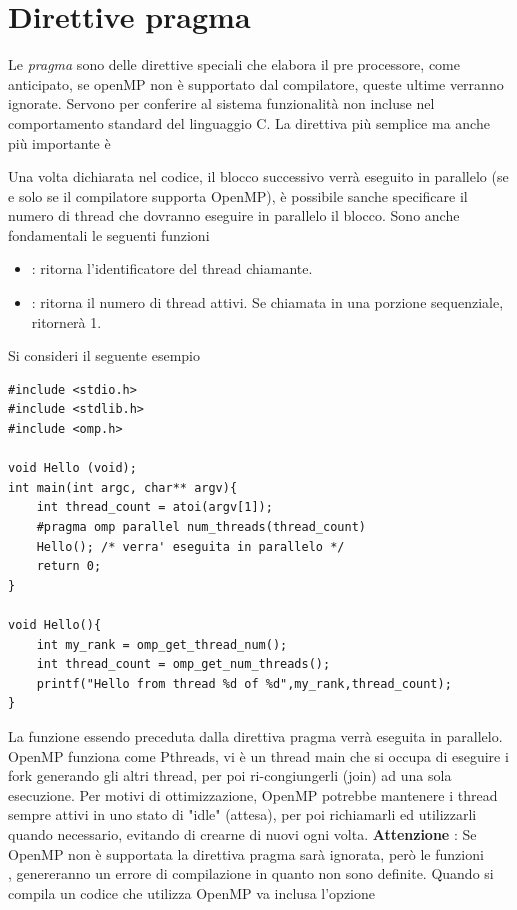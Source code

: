 \documentclass[10pt, letterpaper]{report}
\begin{document}
\section{Direttive pragma}
Le \textit{pragma} sono delle direttive speciali che elabora il pre processore, come anticipato, se openMP non è supportato dal compilatore, queste ultime verranno ignorate. Servono per conferire al sistema funzionalità non incluse nel comportamento standard del linguaggio C. \acc 
La direttiva più semplice ma anche più importante è\begin{quote}
\end{quote}
Una volta dichiarata nel codice, il blocco successivo verrà eseguito in parallelo (se e solo se il compilatore supporta OpenMP), è possibile sanche specificare il numero di thread che dovranno eseguire in parallelo il blocco. Sono anche fondamentali le seguenti funzioni 
\begin{itemize}
    \item {} : ritorna l'identificatore del thread chiamante. 
    \item {} : ritorna il numero di thread attivi. Se chiamata in una porzione sequenziale, ritornerà 1.
\end{itemize}
Si consideri il seguente esempio
\begin{lstlisting}[style=CStyle]
#include <stdio.h>
#include <stdlib.h> 
#include <omp.h>

void Hello (void);
int main(int argc, char** argv){
    int thread_count = atoi(argv[1]);
    #pragma omp parallel num_threads(thread_count)
    Hello(); /* verra' eseguita in parallelo */
    return 0;
}

void Hello(){
    int my_rank = omp_get_thread_num();
    int thread_count = omp_get_num_threads();
    printf("Hello from thread %d of %d",my_rank,thread_count);
}
\end{lstlisting}
La funzione  essendo preceduta dalla direttiva pragma verrà eseguita in parallelo. OpenMP funziona come Pthreads, vi è un thread main che si occupa di eseguire i fork generando gli altri thread, per poi ri-congiungerli (join) ad una sola esecuzione. Per motivi di ottimizzazione, OpenMP potrebbe mantenere i thread sempre attivi in uno stato di "idle" (attesa), per poi richiamarli ed utilizzarli quando necessario, evitando di crearne di nuovi ogni volta.\acc 
\textbf{Attenzione} : Se OpenMP non è supportata la direttiva pragma sarà ignorata, però le funzioni \\,  genereranno un errore di compilazione in quanto non sono definite. Quando si compila un codice che utilizza OpenMP va inclusa l'opzione 
\end{document}
